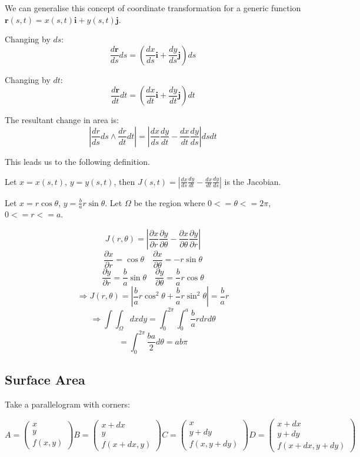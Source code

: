\documentclass[a4paper,10pt]{article}
\begin{document}
We can generalise this concept of coordinate transformation for a
generic function
$ \mathbf{r} (s,t) = x(s,t)\mathbf{i} + y(s,t)\mathbf{j}$.

Changing by $ds$:
\[
	\frac{d\mathbf{r}}{ds} ds =
	\left( \frac{dx}{ds}\mathbf{i} + \frac{dy}{ds}\mathbf{j} \right) ds
\]

Changing by $dt$:
\[
	\frac{d\mathbf{r}}{dt} dt =
	\left( \frac{dx}{dt}\mathbf{i} + \frac{dy}{dt}\mathbf{j} \right) dt
\]

The resultant change in area is:
\[
	| \frac{dr}{ds}ds \wedge \frac{dr}{dt}dt |
	= | \frac{dx}{ds}\frac{dy}{dt} - \frac{dx}{dt}\frac{dy}{ds} | dsdt
\]

This leads us to the following definition.

\begin{defn}[Jacobian]
	Let $x = x(s,t)$, $y = y(s,t)$, then
	$J(s,t) = |\frac{dx}{ds}\frac{dy}{dt} - \frac{dx}{dt}\frac{dy}{ds}|$
	is the Jacobian.
\end{defn}

\begin{ex}[Ellipse]
	Let $x = r\cos\theta$, $y = \frac{b}{a}r\sin\theta$. Let $\Omega$ be the
	region where $0 <= \theta <= 2\pi$, $0 <= r <= a$.

	\[
		J(r,\theta) = \left| \frac{\partial x}{\partial r}
		\frac{\partial y}{\partial \theta} -
		\frac{\partial x}{\partial \theta}
		\frac{\partial y}{\partial r} \right|
	\]
	\[
		\frac{\partial x}{\partial r} = \cos\theta
		\quad
		\frac{\partial x}{\partial \theta} = -r \sin\theta
	\]
	\[
		\frac{\partial y}{\partial r} = \frac{b}{a} \sin\theta
		\quad
		\frac{\partial y}{\partial \theta} = \frac{b}{a}r \cos\theta
	\]
	\[
		\Rightarrow J(r,\theta) = \left| \frac{b}{a}r \cos^2\theta +
		\frac{b}{a}r \sin^2\theta \right| = \frac{b}{a}r
	\]
	\[
		\Rightarrow \int\int_{\Omega} dxdy =
		\int_0^{2\pi} \int_0^a \frac{b}{a}r drd\theta
	\]
	\[
		= \int_0^{2\pi} \frac{ba}{2} d\theta = ab\pi
	\]
\end{ex}

\subsection{Surface Area}

Take a parallelogram with corners:

\[
	A = \begin{pmatrix}
		x \\
		y \\
		f(x,y)
	\end{pmatrix}
	B = \begin{pmatrix}
		x+dx \\
		y \\
		f(x+dx,y)
	\end{pmatrix}
	C = \begin{pmatrix}
		x \\
		y+dy \\
		f(x,y+dy)
	\end{pmatrix}
	D = \begin{pmatrix}
		x+dx \\
		y+dy \\
		f(x+dx,y+dy)
	\end{pmatrix}
\]
\end{document}
